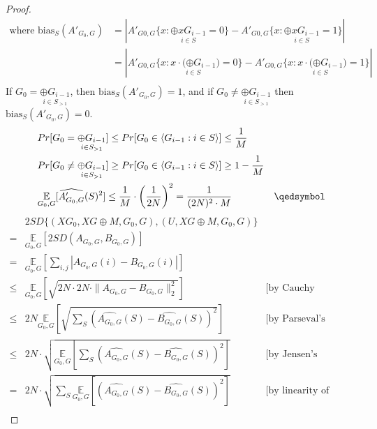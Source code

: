 \begin{proof}
\begin{align*}
\text{where }
\text{bias}_S(A'_{G_0, G})
&= \left| 
	A'_{G0,G} \{ x : \underset{i \in S} {\oplus xG_{i-1}} = 0 \} - 
	A'_{G0,G} \{ x : \underset{i \in S} {\oplus xG_{i-1}} = 1 \} 
	\right| \\
&= \left| 
	A'_{G0,G} \{ x : \underset{i \in S} {x \cdot (\oplus G_{i-1}}) = 0 \} - 
	A'_{G0,G} \{ x : \underset{i \in S} {x \cdot (\oplus G_{i-1}}) = 1 \} 
	\right| \\
\end{align*}
If $G_0 = \underset{i \in S_{>1}} {\oplus G_{i-1}}$, then $\text{bias}_S (A'_{G_0, G}) = 1$, and if $G_0 \neq  \underset{i \in S_{>1}} {\oplus G_{i-1}}$ then $\text{bias}_S (A'_{G_0, G}) = 0$.
\begin{align*}
& Pr[G_0 =  \underset{i \in S_{>1}} {\oplus G_{i-1}}]  
\leq Pr[G_0 \in {\langle G_{i-1} : i \in S \rangle}] \leq \frac{1}{M} \\
& Pr[G_0 \neq  \underset{i \in S_{>1}} {\oplus G_{i-1}}]  
\geq Pr[G_0 \in {\langle G_{i-1} : i \in S \rangle}] \geq 1 - \frac{1}{M} \\
& \underset{G_0, G} {\mathbb{E}} 
	[\widehat{A'_{G_0,G}}(S)^2] \leq \frac{1}{M} \cdot \left( \frac{1}{2N} \right)^2 
	= \frac{1}{(2N)^2 \cdot M} & \qedsymbol
\end{align*}	
\begin{align*}
& 2SD \{ (XG_0, XG \oplus M, G_0, G), (U, XG \oplus M, G_0, G) \} \\
= & \underset{G_0, G} {\mathbb{E}} \left[
	2SD (A_{G_0,G},B_{G_0,G}) \right] \\
= & \underset{G_0, G} {\mathbb{E}} \left[
	\sum\limits_{i,j} | A_{G_0,G}(i)- B_{G_0,G} (i)| \right] \\
\leq & \underset{G_0, G} {\mathbb{E}} \left[ \sqrt{
	2N \cdot 2N \cdot \| A_{G_0,G} - B_{G_0,G} \|_2^2 }  \right] &\text{[by Cauchy Schwartz]} \\	
\leq & 2N \underset{G_0, G} {\mathbb{E}} \left[
	\sqrt{
	\sum\limits_{S} 
		(\widehat{A_{G_0,G}}(S) -
	     \widehat{B_{G_0,G}} (S) )^2 } \right] & \text{[by Parseval's Idenity]} \\
\leq & 2N \cdot \sqrt{
	\underset{G_0, G} {\mathbb{E}} \left[ \sum\limits_{S}   
		(\widehat{A_{G_0,G}}(S) -
	     \widehat{B_{G_0,G}} (S) )^2 \right] } & \text{[by Jensen's Inequality]}\\
= & 2N \cdot \sqrt{
	\sum\limits_{S} \underset{G_0, G} {\mathbb{E}} \left[  
		(\widehat{A_{G_0,G}}(S) -
	     \widehat{B_{G_0,G}} (S) )^2 \right] } & \text{[by linearity of expectation]}\\		

\end{align*}
\end{proof}
